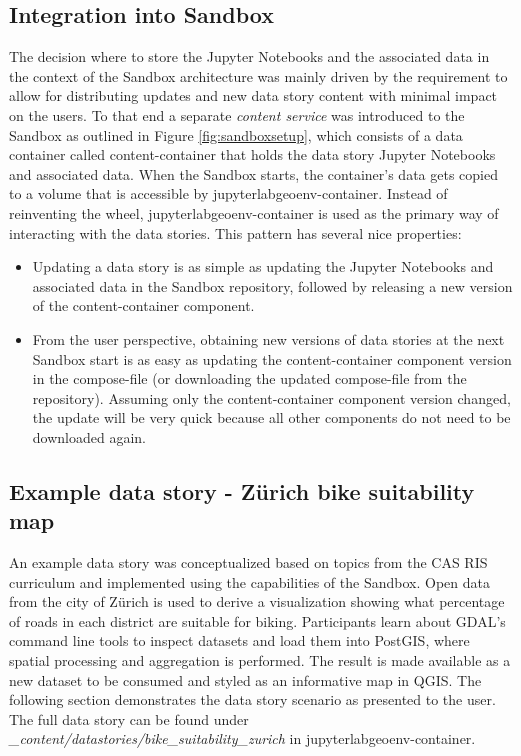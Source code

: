 \documentclass[11pt, a4paper, oneside, parskip=full-]{scrartcl}
\begin{document}
\subsection{Integration into Sandbox}

The decision where to store the Jupyter Notebooks and the associated data in the
context of the Sandbox architecture was mainly driven by the requirement to
allow for distributing updates and new data story content with minimal impact on
the users. To that end a separate \emph{content service} was introduced to the
Sandbox as outlined in Figure \ref{fig:sandboxsetup}, which consists of a data
container called content-container that holds the data story Jupyter Notebooks
and associated data. When the Sandbox starts, the container's data gets copied
to a volume that is accessible by jupyterlabgeoenv-container. Instead of
reinventing the wheel, jupyterlabgeoenv-container is used as the primary way of
interacting with the data stories. This pattern has several nice properties:
\begin{itemize}
  \item Updating a data story is as simple as updating the Jupyter Notebooks and
  associated data in the Sandbox repository, followed by releasing a new version
  of the content-container component.
  \item From the user perspective, obtaining new versions of data stories at the
  next Sandbox start is as easy as updating the content-container component
  version in the compose-file (or downloading the updated compose-file from the
  repository). Assuming only the content-container component version changed,
  the update will be very quick because all other components do not need to be
  downloaded again.
\end{itemize}


\subsection{Example data story - Zürich bike suitability map}
An example data story was conceptualized based on topics from the CAS RIS
curriculum and implemented using the capabilities of the Sandbox. Open data from
the city of Zürich is used to derive a visualization showing what percentage of
roads in each district are suitable for biking. Participants learn about GDAL's
command line tools to inspect datasets and load them into PostGIS, where spatial
processing and aggregation is performed. The result is made available as a new
dataset to be consumed and styled as an informative map in QGIS. The following
section demonstrates the data story scenario as presented to the user. The full
data story can be found under
\emph{\_content/datastories/bike\_suitability\_zurich} in
jupyterlabgeoenv-container.
\end{document}
